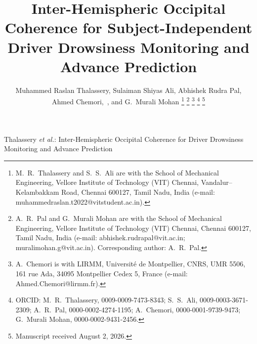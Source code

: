 \documentclass[journal]{IEEEtran}
\DeclareRobustCommand{\add}[1]{#1}                         %
\DeclareRobustCommand{\del}[1]{}                           %
\DeclareRobustCommand{\add}[1]{\hl{#1}}
\DeclareRobustCommand{\del}[1]{{\color{delred}\sout{#1}}\,}
\DeclareRobustCommand{\del}[1]{}                         %
\DeclareRobustCommand{\chg}[2]{\del{#1}\add{#2}}
\begin{document}
\title{\chg{Pro-Active Driver Drowsiness Monitoring Using Two-Channel Occipital EEG}{Inter-Hemispheric Occipital Coherence for Subject-Independent Driver Drowsiness Monitoring and Advance Prediction}}

\author{
    Muhammed Raslan Thalassery,
    Sulaiman Shiyas Ali,
    \chg{Abhishek Rudra Pal,~\IEEEmembership{Member,~IEEE},}{Abhishek Rudra Pal,}
    \add{Ahmed Chemori,~,}
    and G.~Murali Mohan
\thanks{M.~R.~Thalassery and S.~S.~Ali are with the School of Mechanical Engineering, Vellore Institute of Technology (VIT) Chennai, Vandalur--Kelambakkam Road, Chennai 600127, Tamil Nadu, India (e-mail: muhammedraslan.t2022@vitstudent.ac.in).}
\thanks{A.~R.~Pal and G.~Murali Mohan are with the School of Mechanical Engineering, Vellore Institute of Technology (VIT) Chennai, Chennai 600127, Tamil Nadu, India (e-mail: abhishek.rudrapal@vit.ac.in; muralimohan.g@vit.ac.in). Corresponding author: A.~R.~Pal.}
\thanks{\add{A.~Chemori is with LIRMM, Universit\'e de Montpellier, CNRS, UMR 5506, 161 rue Ada, 34095 Montpellier Cedex 5, France (e-mail: Ahmed.Chemori@lirmm.fr).}}
\thanks{\add{ORCID: M.~R.~Thalassery, 0009-0009-7473-8343; S.~S.~Ali, 0009-0003-3671-2309; A.~R.~Pal, 0000-0002-4274-1195; A.~Chemori, 0000-0001-9739-9473; G.~Murali Mohan, 0000-0002-9431-2456.}}
\thanks{Manuscript received August 2, 2026.}
}

{Thalassery \MakeLowercase{\textit{et al.}}: Inter-Hemispheric Occipital Coherence for Driver Drowsiness Monitoring and Advance Prediction}

\maketitle
\end{document}
